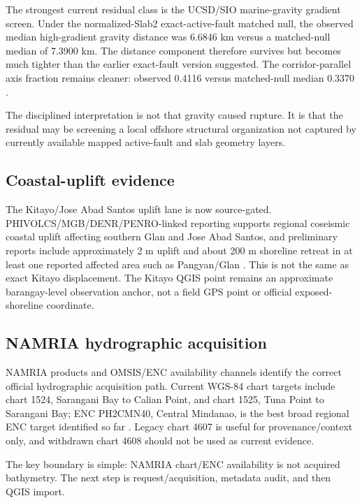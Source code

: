 \documentclass[11pt]{article}
\begin{document}
The strongest current residual class is the UCSD/SIO marine-gravity gradient screen. Under the normalized-Slab2 exact-active-fault matched null, the observed median high-gradient gravity distance was 6.6846 km versus a matched-null median of 7.3900 km. The distance component therefore survives but becomes much tighter than the earlier exact-fault version suggested. The corridor-parallel axis fraction remains cleaner: observed 0.4116 versus matched-null median 0.3370 \cite{tmch-v05}.

The disciplined interpretation is not that gravity caused rupture. It is that the residual may be screening a local offshore structural organization not captured by currently available mapped active-fault and slab geometry layers.

\subsection{Coastal-uplift evidence}

The Kitayo/Jose Abad Santos uplift lane is now source-gated. PHIVOLCS/MGB/DENR/PENRO-linked reporting supports regional coseismic coastal uplift affecting southern Glan and Jose Abad Santos, and preliminary reports include approximately 2 m uplift and about 200 m shoreline retreat in at least one reported affected area such as Pangyan/Glan \cite{kitayo-ladder}. This is not the same as exact Kitayo displacement. The Kitayo QGIS point remains an approximate barangay-level observation anchor, not a field GPS point or official exposed-shoreline coordinate.

\subsection{NAMRIA hydrographic acquisition}

NAMRIA products and OMSIS/ENC availability channels identify the correct official hydrographic acquisition path. Current WGS-84 chart targets include chart 1524, Sarangani Bay to Calian Point, and chart 1525, Tuna Point to Sarangani Bay; ENC PH2CMN40, Central Mindanao, is the best broad regional ENC target identified so far \cite{namria-gate,namria-products}. Legacy chart 4607 is useful for provenance/context only, and withdrawn chart 4608 should not be used as current evidence.

The key boundary is simple: NAMRIA chart/ENC availability is not acquired bathymetry. The next step is request/acquisition, metadata audit, and then QGIS import.
\end{document}
